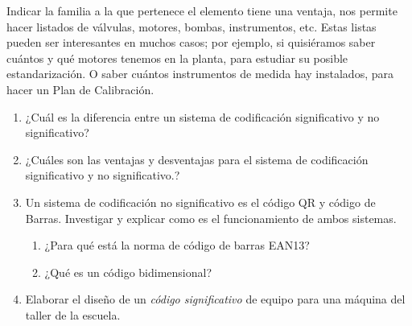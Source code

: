 Indicar la familia a la que pertenece el elemento tiene una ventaja, nos
permite hacer listados de válvulas, motores, bombas, instrumentos, etc. Estas listas pueden ser interesantes en muchos casos; por ejemplo, si quisiéramos saber cuántos y qué motores tenemos en la planta, para estudiar su
posible estandarización. O saber cuántos instrumentos de medida hay instalados, para hacer un Plan de Calibración.

\begin{enumerate}
    \item ¿Cuál es la diferencia entre un sistema de codificación significativo y no significativo?
    \item ¿Cuáles son las ventajas y desventajas para el sistema de codificación significativo y no significativo.?
    \item Un sistema de codificación no significativo es el código QR y código de Barras. Investigar y explicar como es el funcionamiento de ambos sistemas.
    \begin{enumerate}
        \item ¿Para qué está la norma de código de barras EAN13?
        \item ¿Qué es un código bidimensional?
    \end{enumerate}
    
    \item Elaborar el diseño de un \emph{código significativo} de equipo para una máquina del taller de la escuela. 
    
\end{enumerate}



